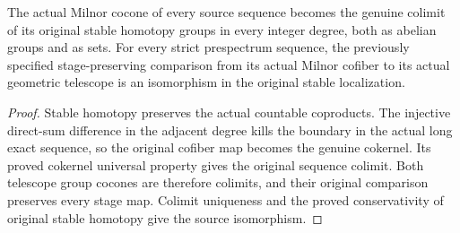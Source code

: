 \begin{proposition}
  \label{prop:actual-milnor-telescope-isomorphism}
  \leanok
  The actual Milnor cocone of every source sequence becomes the genuine colimit of its original stable homotopy groups in every integer degree, both as abelian groups and as sets. For every strict prespectrum sequence, the previously specified stage-preserving comparison from its actual Milnor cofiber to its actual geometric telescope is an isomorphism in the original stable localization.
\end{proposition}
\begin{proof}
  Stable homotopy preserves the actual countable coproducts. The injective direct-sum difference in the adjacent degree kills the boundary in the actual long exact sequence, so the original cofiber map becomes the genuine cokernel. Its proved cokernel universal property gives the original sequence colimit. Both telescope group cocones are therefore colimits, and their original comparison preserves every stage map. Colimit uniqueness and the proved conservativity of original stable homotopy give the source isomorphism.
  \leanok
\end{proof}

